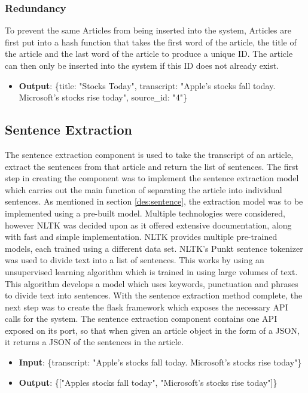         \subsubsection{Redundancy} To prevent the same Articles from being inserted into the system, Articles are first put into a hash function that takes the first word of the article, the title of the article and the last word of the article to produce a unique ID. The article can then only be inserted into the system if this ID does not already exist.
        
        \begin{itemize}
            \item \textbf{Output}: \{title: "Stocks Today", transcript: "Apple's stocks fall today. Microsoft's stocks rise today", source\_id: "4"\}
        \end{itemize}    
            
        \subsection{Sentence Extraction}
        The sentence extraction component is used to take the transcript of an article, extract the sentences from that article and return the list of sentences. The first step in creating the component was to implement the sentence extraction model which carries out the main function of separating the article into individual sentences. As mentioned in section \ref{des:sentence}, the extraction model was to be implemented using a pre-built model. Multiple technologies were considered, however NLTK \cite{Technology:NLTK} was decided upon as it offered extensive documentation, along with fast and simple implementation. NLTK provides multiple pre-trained models, each trained using a different data set. NLTK's Punkt sentence tokenizer was used to divide text into a list of sentences. This works by using an unsupervised learning algorithm which is trained in using large volumes of text. This algorithm develops a model which uses keywords, punctuation and phrases to divide text into sentences. With the sentence extraction method complete, the next step was to create the flask framework which exposes the necessary API calls for the system. The sentence extraction component contains one API exposed on its port, so that when given an article object in the form of a JSON, it returns a JSON of the sentences in the article.
        
        \begin{itemize}
            \item \textbf{Input}: \{transcript: "Apple's stocks fall today. Microsoft's stocks rise today"\}
            \item \textbf{Output}: \{["Apples stocks fall today", "Microsoft's stocks rise today"]\}
        \end{itemize}
        
